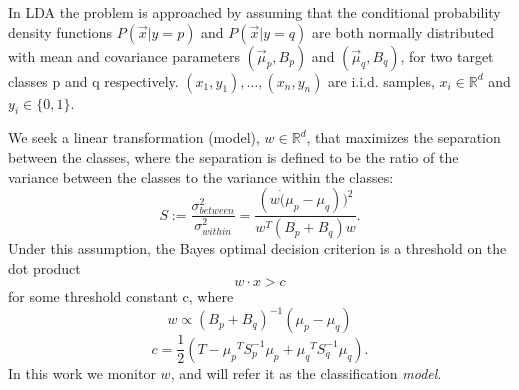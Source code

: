 \documentclass{sig-alternate-05-2015}
\begin{document}
In LDA the problem is approached by assuming that the conditional probability
density functions $P(\vec x|y=p)$ and $P(\vec x|y=q)$ are both normally distributed with
mean and covariance parameters $\left(\vec \mu_p, B_p\right)$ and
$\left(\vec \mu_q, B_q\right)$, for two target classes p and q respectively.
${(x_1,y_1),\ldots,(x_n,y_n)}$ are i.i.d. samples, $x_i \in \mathbb{R}^d$
and $y_i \in \{0,1\}$.

We seek a linear transformation (model), $w \in \mathbb{R}^d $,
that maximizes the separation between the classes, where the separation is
defined to be the ratio of the variance between the classes to the variance
within the classes:
\begin{equation*}
S := \frac{\sigma^2_{between}}{\sigma^2_{within}} = \frac{(w \dot (\mu_p -
\mu_q))^2}{w^T(B_p+B_q)w}.
\end{equation*}
Under this assumption, the Bayes optimal decision criterion is a threshold on the
dot product
\begin{equation*} \label{eq:decision}
w \cdot x > c
\end{equation*}
for some threshold constant c, where
\begin{equation} \label{eq:w}
w \propto (B_p+B_q)^{-1}(\mu_p - \mu_q)
\end{equation}
\begin{equation} \label{eq:c}
c = \frac{1}{2}(T-{\mu_p}^T S_p^{-1} {\mu_p}+{\mu_q}^T S_q^{-1} {\mu_q}).
\end{equation}
In this work we monitor $w$, and will refer it as the
classification \textit{model}.
\end{document}
